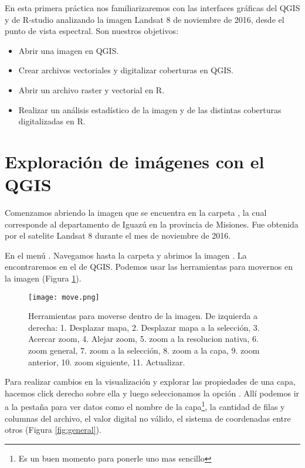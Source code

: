 En esta primera práctica nos familiarizaremos con las interfaces gráficas del
QGIS y de R-studio analizando la imagen Landsat 8 de noviembre de
2016, desde el punto de vista espectral. Son nuestros objetivos:

\begin{itemize}
    \item Abrir una imagen en QGIS.
    \item Crear archivos vectoriales y digitalizar coberturas en QGIS.
    \item Abrir un archivo raster y vectorial en R.
    \item Realizar un análisis estad\'istico de la imagen y de las
        distintas coberturas digitalizadas en R.
\end{itemize}
\section{Exploración de im\'agenes con el QGIS}

Comenzamos abriendo la imagen  que se encuentra
en la carpeta , la cual  corresponde al
departamento de Iguaz\'u en la provincia de Misiones. Fue obtenida por
el satelite Landsat 8 durante el mes de noviembre de 2016.

En el menú . Navegamos
hasta la carpeta  y abrimos la imagen
. La encontraremos
en el  de QGIS. Podemos usar las herramientas para
movernos en la imagen (Figura \ref{fig:move}).

\begin{figure}[h!]
\begin{center}
    \texttt{[image: move.png]}
\end{center}
\caption{Herramientas para moverse dentro de la imagen. De izquierda a derecha:
    1. Desplazar mapa, 2. Desplazar mapa a la selecci\'on, 3. Acercar zoom, 4.
    Alejar zoom, 5. zoom a la resolucion nativa, 6. zoom general, 7. zoom a la
    selecci\'on, 8. zoom a la capa, 9. zoom anterior, 10. zoom siguiente, 11.
    Actualizar.}
\label{fig:move}
\end{figure}

Para realizar cambios en la visualizaci\'on y explorar las propiedades de una
capa, hacemos click derecho sobre ella y luego seleccionamos la opci\'on
. All\'i podemos ir a la pestaña
 para ver datos como el nombre de la capa\footnote{Es un buen
momento para ponerle uno mas sencillo}, la cantidad de filas y columnas del
archivo, el valor digital no v\'alido, el sistema de coordenadas
entre otros (Figura \ref{fig:general}).


